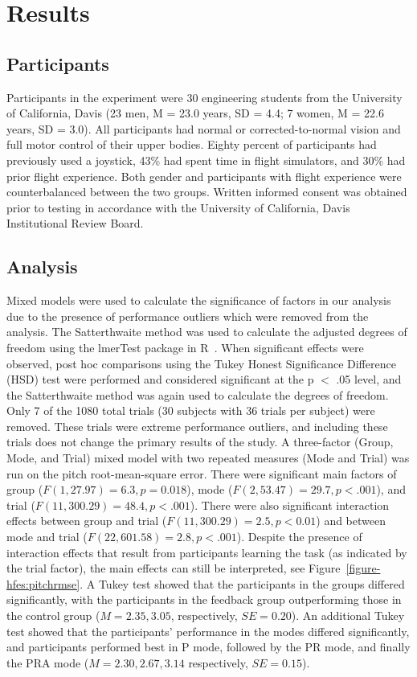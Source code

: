 \section{Results}
\subsection{Participants}
Participants in the experiment were 30 engineering students from the University of California, Davis (23 men, M = 23.0 years, SD = 4.4; 7 women, M = 22.6 years, SD = 3.0).
All participants had normal or corrected-to-normal vision and full motor control of their upper bodies.
Eighty percent of participants had previously used a joystick, 43\% had spent time in flight simulators, and 30\% had prior flight experience.
Both gender and participants with flight experience were counterbalanced between the two groups.
Written informed consent was obtained prior to testing in accordance with the University of California, Davis Institutional Review Board.

\subsection{Analysis}
Mixed models were used to calculate the significance of factors in our analysis due to the presence of performance outliers which were removed from the analysis.
The Satterthwaite method was used to calculate the adjusted degrees of freedom using the lmerTest package in R~\citep{RN53}.
When significant effects were observed, post hoc comparisons using the Tukey Honest Significance Difference (HSD) test were performed and considered significant at the p $<$ .05 level, and the Satterthwaite method was again used to calculate the degrees of freedom.
Only 7 of the 1080 total trials (30 subjects with 36 trials per subject) were removed.
These trials were extreme performance outliers, and including these trials does not change the primary results of the study.
A three-factor (Group, Mode, and Trial) mixed model with two repeated measures (Mode and Trial) was run on the pitch root-mean-square error.
There were significant main factors of group ($F(1, 27.97) = 6.3, p = 0.018$), mode ($F(2, 53.47) = 29.7, p < .001$), and trial ($F(11, 300.29) = 48.4, p < .001$).
There were also significant interaction effects between group and trial ($F(11, 300.29) = 2.5, p < 0.01$) and between mode and trial ($F(22, 601.58) = 2.8, p < .001$).
Despite the presence of interaction effects that result from participants learning the task (as indicated by the trial factor), the main effects can still be interpreted, see Figure~\ref{figure-hfes:pitchrmse}.
A Tukey test showed that the participants in the groups differed significantly, with the participants in the feedback group outperforming those in the control group ($M = 2.35, 3.05$, respectively, $SE = 0.20$).
An additional Tukey test showed that the participants' performance in the modes differed significantly, and participants performed best in P mode, followed by the PR mode, and finally the PRA mode ($M = 2.30, 2.67, 3.14$ respectively, $SE = 0.15$).

